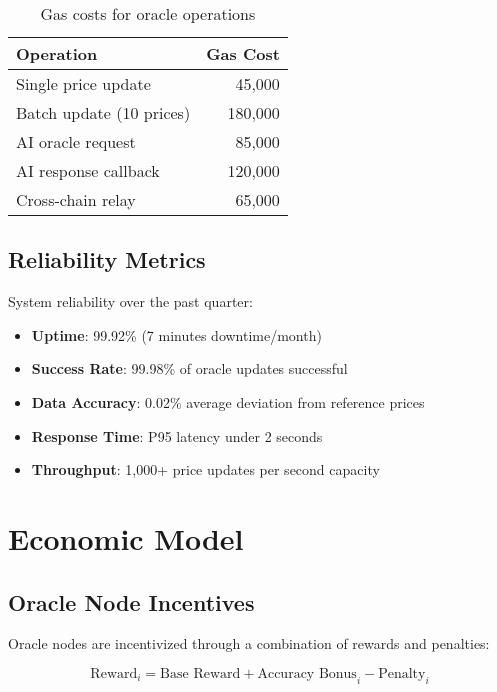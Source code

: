 \documentclass[11pt]{article}
\begin{document}
\begin{table}[h]
\centering
\begin{tabular}{lr}
\toprule
\textbf{Operation} & \textbf{Gas Cost} \\
\midrule
Single price update & 45,000 \\
Batch update (10 prices) & 180,000 \\
AI oracle request & 85,000 \\
AI response callback & 120,000 \\
Cross-chain relay & 65,000 \\
\bottomrule
\end{tabular}
\caption{Gas costs for oracle operations}
\end{table}

\subsection{Reliability Metrics}

System reliability over the past quarter:

\begin{itemize}
    \item \textbf{Uptime}: 99.92\% (7 minutes downtime/month)
    \item \textbf{Success Rate}: 99.98\% of oracle updates successful
    \item \textbf{Data Accuracy}: 0.02\% average deviation from reference prices
    \item \textbf{Response Time}: P95 latency under 2 seconds
    \item \textbf{Throughput}: 1,000+ price updates per second capacity
\end{itemize}

\section{Economic Model}

\subsection{Oracle Node Incentives}

Oracle nodes are incentivized through a combination of rewards and penalties:

\begin{equation}
\text{Reward}_i = \text{Base Reward} + \text{Accuracy Bonus}_i - \text{Penalty}_i
\end{equation}
\end{document}
